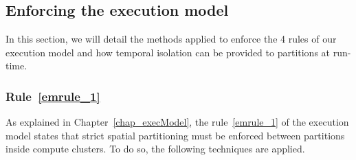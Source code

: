 \documentclass[main.tex]{subfiles}
\begin{document}
\subsection{Enforcing the execution model}
\label{ssec_implemExecModel_enforceEMrules}
In this section, we will detail the methods applied to enforce the 4 rules of
our execution model and how temporal isolation can be provided to partitions at
run-time.

\subsubsection{Rule~\ref{emrule_1}} As explained in
Chapter~\ref{chap_execModel}, the rule~\ref{emrule_1} of the execution model
states that strict spatial partitioning must be enforced between partitions
inside compute clusters. To do so, the following techniques are applied.
\end{document}
